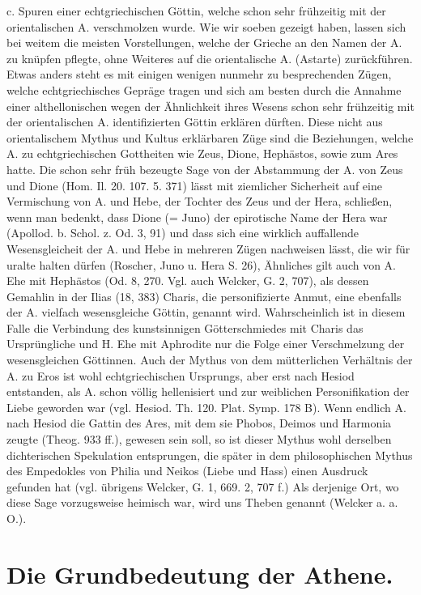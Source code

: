 \documentclass[a4paper, 11pt, oneside]{article}
\begin{document}
c. Spuren einer echtgriechischen Göttin, welche schon sehr frühzeitig mit der orientalischen A. verschmolzen wurde. Wie wir soeben gezeigt haben, lassen sich bei weitem die meisten Vorstellungen, welche der Grieche an den Namen der A. zu knüpfen pflegte, ohne Weiteres auf die orientalische A. (Astarte) zurückführen. Etwas anders steht es mit einigen wenigen nunmehr zu besprechenden Zügen, welche echtgriechisches Gepräge tragen und sich am besten durch die Annahme einer althellonischen wegen der Ähnlichkeit ihres Wesens schon sehr frühzeitig mit der orientalischen A. identifizierten Göttin erklären dürften. Diese nicht aus orientalischem Mythus und Kultus erklärbaren Züge sind die Beziehungen, welche A. zu echtgriechischen Gottheiten wie Zeus, Dione, Hephästos, sowie zum Ares hatte. Die schon sehr früh bezeugte Sage von der Abstammung der A. von Zeus und Dione (Hom. Il. 20. 107. 5. 371) lässt mit ziemlicher Sicherheit auf eine Vermischung von A. und Hebe, der Tochter des Zeus und der Hera, schließen, wenn man bedenkt, dass Dione (= Juno) der epirotische Name der Hera war (Apollod. b. Schol. z. Od. 3, 91) und dass sich eine wirklich auffallende Wesensgleicheit der A. und Hebe in mehreren Zügen nachweisen lässt, die wir für uralte halten dürfen (Roscher, Juno u. Hera S. 26), Ähnliches gilt auch von A. Ehe mit Hephästos (Od. 8, 270. Vgl. auch Welcker, G. 2, 707), als dessen Gemahlin in der Ilias (18, 383) Charis, die personifizierte Anmut, eine ebenfalls der A. vielfach wesensgleiche Göttin, genannt wird. Wahrscheinlich ist in diesem Falle die Verbindung des kunstsinnigen Götterschmiedes mit Charis das Ursprüngliche und H. Ehe mit Aphrodite nur die Folge einer Verschmelzung der wesensgleichen Göttinnen. Auch der Mythus von dem mütterlichen Verhältnis der A. zu Eros ist wohl echtgriechischen Ursprungs, aber erst nach Hesiod entstanden, als A. schon völlig hellenisiert und zur weiblichen Personifikation der Liebe geworden war (vgl. Hesiod. Th. 120. Plat. Symp. 178 B). Wenn endlich A. nach Hesiod die Gattin des Ares, mit dem sie Phobos, Deimos und Harmonia zeugte (Theog. 933 ff.), gewesen sein soll, so ist dieser Mythus wohl derselben dichterischen Spekulation entsprungen, die später in dem philosophischen Mythus des Empedokles von Philia und Neikos (Liebe und Hass) einen Ausdruck gefunden hat (vgl. übrigens Welcker, G. 1, 669. 2, 707 f.) Als derjenige Ort, wo diese Sage vorzugsweise heimisch war, wird uns Theben genannt (Welcker a. a. O.).
\clearpage
\section{Die Grundbedeutung der Athene.}
\end{document}
